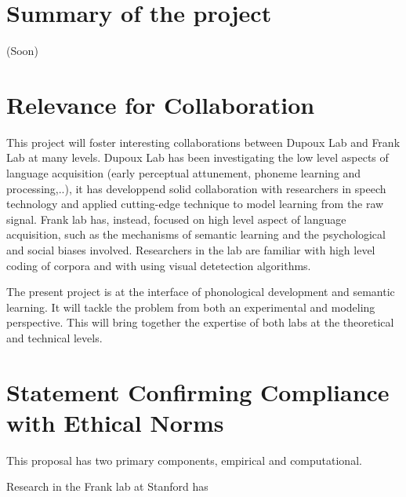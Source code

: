 \documentclass[12pt]{article}
\begin{document}
\section*{Summary of the project}
(Soon) 

\newpage

\section*{Relevance for Collaboration}


This project will foster interesting collaborations between Dupoux Lab and Frank Lab at many levels.
Dupoux Lab has been investigating the low level aspects of language acquisition (early perceptual attunement, phoneme learning and processing,..), it has developpend solid collaboration with researchers in speech technology and applied cutting-edge technique to model learning from the raw signal. Frank lab has, instead, focused on high level aspect of language acquisition, such as the mechanisms of semantic learning and the psychological and social biases involved. Researchers in the lab are familiar with high level coding of corpora and with using visual detetection algorithms. 

The present project is at the interface of phonological development and semantic learning. It will tackle the problem from both an experimental and modeling perspective. This will bring together the expertise of both labs at the theoretical and technical levels. 

\newpage

\section*{Statement Confirming Compliance with Ethical Norms}
 
This proposal has two primary components, empirical and computational. 

Research in the Frank lab at Stanford has 
\end{document}
